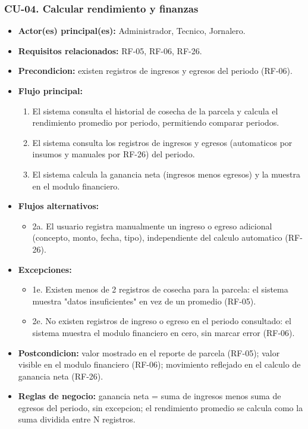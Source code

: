 \documentclass[11pt,a4paper]{article}
\begin{document}
\subsubsection{CU-04. Calcular rendimiento y finanzas}
\begin{itemize}
\item \textbf{Actor(es) principal(es):} Administrador, Tecnico, Jornalero.
\item \textbf{Requisitos relacionados:} RF-05, RF-06, RF-26.
\item \textbf{Precondicion:} existen registros de ingresos y egresos del periodo (RF-06).
\item \textbf{Flujo principal:}
  \begin{enumerate}
  \item El sistema consulta el historial de cosecha de la parcela y calcula el rendimiento promedio por periodo, permitiendo comparar periodos.
  \item El sistema consulta los registros de ingresos y egresos (automaticos por insumos y manuales por RF-26) del periodo.
  \item El sistema calcula la ganancia neta (ingresos menos egresos) y la muestra en el modulo financiero.
  \end{enumerate}
\item \textbf{Flujos alternativos:}
  \begin{itemize}
  \item 2a. El usuario registra manualmente un ingreso o egreso adicional (concepto, monto, fecha, tipo), independiente del calculo automatico (RF-26).
  \end{itemize}
\item \textbf{Excepciones:}
  \begin{itemize}
  \item 1e. Existen menos de 2 registros de cosecha para la parcela: el sistema muestra "datos insuficientes" en vez de un promedio (RF-05).
  \item 2e. No existen registros de ingreso o egreso en el periodo consultado: el sistema muestra el modulo financiero en cero, sin marcar error (RF-06).
  \end{itemize}
\item \textbf{Postcondicion:} valor mostrado en el reporte de parcela (RF-05); valor visible en el modulo financiero (RF-06); movimiento reflejado en el calculo de ganancia neta (RF-26).
\item \textbf{Reglas de negocio:} ganancia neta = suma de ingresos menos suma de egresos del periodo, sin excepcion; el rendimiento promedio se calcula como la suma dividida entre N registros.
\end{itemize}
\end{document}
